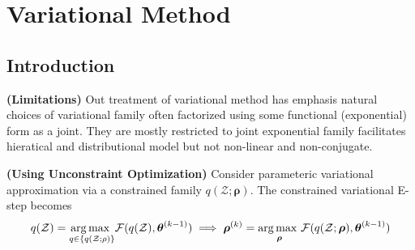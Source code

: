 \section{Variational Method}

\subsection{Introduction}

\begin{remark}{\textbf{(Limitations)}}
    Out treatment of variational method has emphasis natural choices of variational family often factorized using some functional (exponential) form as a joint. They are mostly restricted to joint exponential family facilitates hieratical and distributional model but not non-linear and non-conjugate. 
\end{remark}

\begin{remark}{\textbf{(Using Unconstraint Optimization)}}
    Consider parameteric variational approximation via a constrained family $q(\mathcal{Z};\boldsymbol \rho)$. The constrained variational E-step becomes
    \begin{equation*}
        q(\mathcal{Z}) = \underset{q\in\left\{ q(\mathcal{Z};\rho) \right\}}{\arg\max \ } \mathcal{F}(q(\mathcal{Z}), \boldsymbol \theta^{(k-1)}) \implies \boldsymbol \rho^{(k)} = \underset{\boldsymbol \rho}{\arg\max \ }\mathcal{F}(q(\mathcal{Z};\boldsymbol \rho), \boldsymbol \theta^{(k-1)})
    \end{equation*}
\end{remark}

